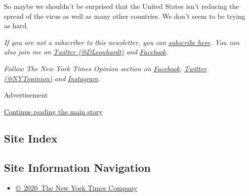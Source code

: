 So maybe we shouldn't be surprised that the United States isn't reducing
the spread of the virus as well as many other countries. We don't seem
to be trying as hard.

\emph{If you are not a subscriber to this newsletter, you can}
\href{https://www.nytimes.com/newsletters/david-leonhardt}{\emph{subscribe
here}}\emph{. You can also join me on}
\href{https://twitter.com/DLeonhardt}{\emph{Twitter (@DLeonhardt)}}
\emph{and}
\href{https://www.facebook.com/DavidRLeonhardt/}{\emph{Facebook}}\emph{.}

\emph{Follow The New York Times Opinion section on}
\href{https://www.facebook.com/nytopinion}{\emph{Facebook}}\emph{,}
\href{http://twitter.com/NYTOpinion}{\emph{Twitter (@NYTopinion)}}
\emph{and}
\href{https://www.instagram.com/nytopinion/}{\emph{Instagram}}\emph{.}

Advertisement

\protect\hyperlink{after-bottom}{Continue reading the main story}

\hypertarget{site-index}{%
\subsection{Site Index}\label{site-index}}

\hypertarget{site-information-navigation}{%
\subsection{Site Information
Navigation}\label{site-information-navigation}}

\begin{itemize}
\tightlist
\item
  \href{https://help.nytimes.com/hc/en-us/articles/115014792127-Copyright-notice}{©~2020~The
  New York Times Company}
\end{itemize}

